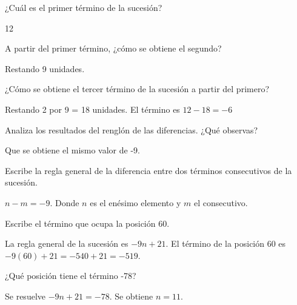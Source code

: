 \begin{multicols}{2}
    \begin{parts}
        ¿Cuál es el primer término de la sucesión?

        \begin{solutionbox}{4em}
            12
        \end{solutionbox}

        A partir del primer término, ¿cómo se obtiene el segundo?

        \begin{solutionbox}{4em}
            Restando 9 unidades.
        \end{solutionbox}

        ¿Cómo se obtiene el tercer término de la sucesión a partir del primero?

        \begin{solutionbox}{5em}
            Restando 2 por 9 = 18 unidades. El término es $12 - 18 = - 6$
        \end{solutionbox}

        Analiza los resultados del renglón de las diferencias. ¿Qué observas?

        \begin{solutionbox}{4em}
            Que se obtiene el mismo valor de -9.
        \end{solutionbox}

        \columnbreak
        Escribe la regla general de la diferencia entre dos términos consecutivos de la
        sucesión.

        \begin{solutionbox}{5em}
            $n - m = -9$. Donde $n$ es el enésimo elemento y $m$ el consecutivo.
        \end{solutionbox}

        Escribe el término que ocupa la posición 60.

        \begin{solutionbox}{6em}
            La regla general de la sucesión es $-9n + 21$. El término de la posición
            60 es $-9(60) + 21 = -540 + 21 = -519$.
        \end{solutionbox}

        ¿Qué posición tiene el término -78?

        \begin{solutionbox}{4em}
            Se resuelve $-9n + 21 = -78$. Se obtiene $n = 11$.
        \end{solutionbox}


\end{parts}
\end{multicols}

